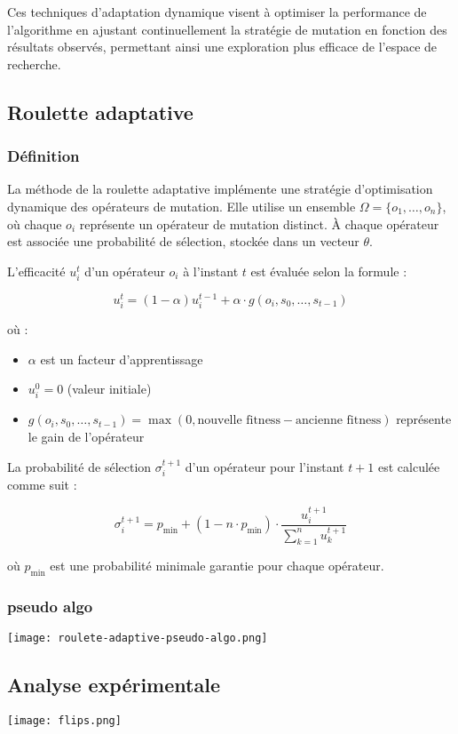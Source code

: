 \documentclass{article}
\begin{document}
Ces techniques d'adaptation dynamique visent à optimiser la performance de l'algorithme en ajustant continuellement la stratégie de mutation en fonction des résultats observés, permettant ainsi une exploration plus efficace de l'espace de recherche.

\subsection{Roulette adaptative}
\subsubsection{Définition}

La méthode de la roulette adaptative implémente une stratégie d'optimisation dynamique des opérateurs de mutation. Elle utilise un ensemble $\Omega = \{o_1, \ldots, o_n\}$, où chaque $o_i$ représente un opérateur de mutation distinct. À chaque opérateur est associée une probabilité de sélection, stockée dans un vecteur $\theta$.

L'efficacité $u^t_i$ d'un opérateur $o_i$ à l'instant $t$ est évaluée selon la formule :

\begin{equation}
    u^t_i = (1 - \alpha)u^{t-1}_i + \alpha \cdot g(o_i, s_0, \ldots, s_{t-1})
\end{equation}

où :
\begin{itemize}
    \item $\alpha$ est un facteur d'apprentissage
    \item $u^0_i = 0$ (valeur initiale)
    \item $g(o_i, s_0, \ldots, s_{t-1}) = \max(0, \text{nouvelle fitness} - \text{ancienne fitness})$ représente le gain de l'opérateur
\end{itemize}

La probabilité de sélection $\sigma^{t+1}_i$ d'un opérateur pour l'instant $t+1$ est calculée comme suit :

\begin{equation}
    \sigma^{t+1}_i = p_{\text{min}} + (1 - n \cdot p_{\text{min}}) \cdot \frac{u^{t+1}_i}{\sum_{k=1}^n u^{t+1}_k}
\end{equation}

où $p_{\text{min}}$ est une probabilité minimale garantie pour chaque opérateur.

\subsubsection{pseudo algo}
\texttt{[image: roulete-adaptive-pseudo-algo.png]}

\subsection{Analyse expérimentale}

\texttt{[image: flips.png]}
\end{document}

